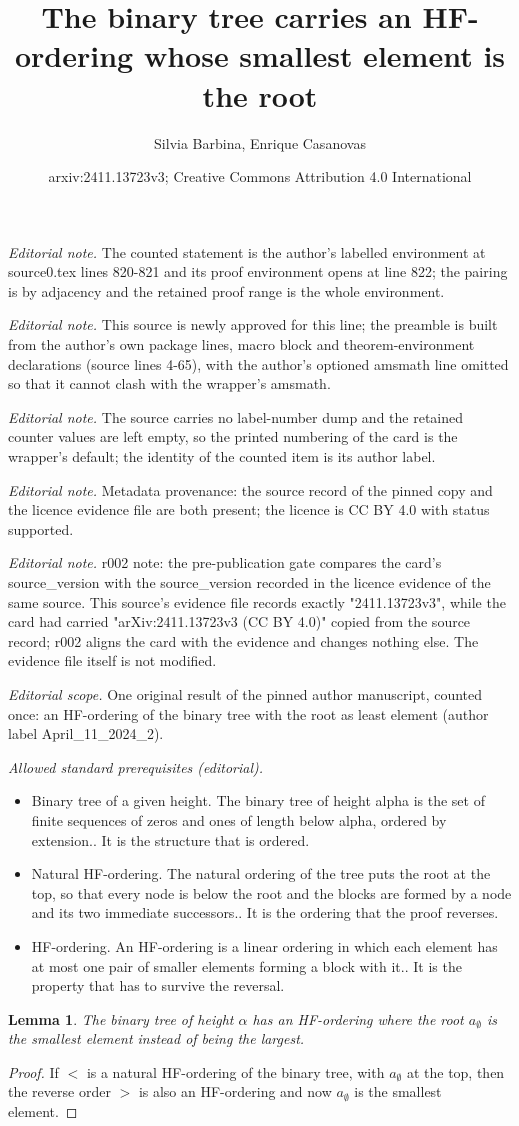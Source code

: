 \documentclass[10pt,a4paper]{article}
\title{The binary tree carries an HF-ordering whose smallest element is the root}
\author{Silvia Barbina, Enrique Casanovas}
\date{arxiv:2411.13723v3; Creative Commons Attribution 4.0 International}
\theoremstyle{note}
\newtheorem{lemma}[thm]{Lemma}
\begin{document}
\maketitle
\noindent\textit{Editorial note.} The counted statement is the author's labelled environment at source0.tex lines 820-821 and its proof environment opens at line 822; the pairing is by adjacency and the retained proof range is the whole environment.\par\medskip
\noindent\textit{Editorial note.} This source is newly approved for this line; the preamble is built from the author's own package lines, macro block and theorem-environment declarations (source lines 4-65), with the author's optioned amsmath line omitted so that it cannot clash with the wrapper's amsmath.\par\medskip
\noindent\textit{Editorial note.} The source carries no label-number dump and the retained counter values are left empty, so the printed numbering of the card is the wrapper's default; the identity of the counted item is its author label.\par\medskip
\noindent\textit{Editorial note.} Metadata provenance: the source record of the pinned copy and the licence evidence file are both present; the licence is CC BY 4.0 with status supported.\par\medskip
\noindent\textit{Editorial note.} r002 note: the pre-publication gate compares the card's source\_version with the source\_version recorded in the licence evidence of the same source. This source's evidence file records exactly "2411.13723v3", while the card had carried "arXiv:2411.13723v3 (CC BY 4.0)" copied from the source record; r002 aligns the card with the evidence and changes nothing else. The evidence file itself is not modified.\par\medskip
\noindent\textit{Editorial scope.} One original result of the pinned author manuscript, counted once: an HF-ordering of the binary tree with the root as least element (author label April\_11\_2024\_2).\par\medskip
\noindent\textit{Allowed standard prerequisites (editorial).}\begin{itemize}
\item Binary tree of a given height. The binary tree of height alpha is the set of finite sequences of zeros and ones of length below alpha, ordered by extension.. It is the structure that is ordered.
\item Natural HF-ordering. The natural ordering of the tree puts the root at the top, so that every node is below the root and the blocks are formed by a node and its two immediate successors.. It is the ordering that the proof reverses.
\item HF-ordering. An HF-ordering is a linear ordering in which each element has at most one pair of smaller elements forming a block with it.. It is the property that has to survive the reversal.
\end{itemize}\medskip
\begin{lemma}\label{April_11_2024_2} The binary tree of height $\alpha$ has an HF-ordering where the root  $a_\emptyset$ is the smallest element instead of being the largest.
\end{lemma}

\begin{proof}  If $<$ is  a natural HF-ordering of the binary tree, with $a_\emptyset$ at the top, then the reverse order $>$ is also an HF-ordering and now $a_\emptyset$ is the smallest element.
\end{proof}
\end{document}
